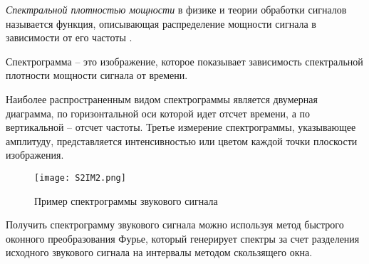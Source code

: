\emph{Спектральной плотностью мощности} в физике и теории обработки сигналов называется функция,
описывающая распределение мощности сигнала в зависимости от его частоты \cite{goldenberg}. 

Спектрограмма -- это изображение, которое показывает зависимость спектральной плотности мощности сигнала от времени.

Наиболее распространенным видом спектрограммы является двумерная диаграмма, по горизонтальной оси которой идет отсчет времени,
а по вертикальной -- отсчет частоты. Третье измерение спектрограммы, указывающее амплитуду, 
представляется интенсивностью или цветом каждой точки плоскости изображения.

\begin{figure}[h!]
    \centering
    \texttt{[image: S2IM2.png]}
    \caption{Пример спектрограммы звукового сигнала}
\end{figure}

Получить спектрограмму звукового сигнала можно используя метод быстрого оконного преобразования Фурье,
который генерирует спектры за счет разделения исходного звукового сигнала на интервалы методом скользящего окна.